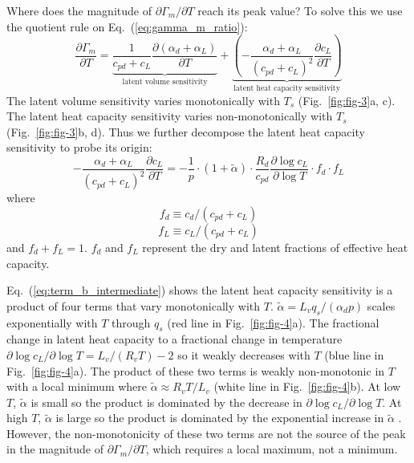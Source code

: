 \documentclass[draft]{ametsocV6.1}
\begin{document}
Where does the magnitude of $\partial\Gamma_m/\partial T$ reach its peak value? To solve this we use the quotient rule on Eq.~(\ref{eq:gamma_m_ratio}):
\begin{equation}
\frac{\partial\Gamma_m}{\partial T} = \underbrace{\frac{1}{c_{pd} + c_L}\frac{\partial(\alpha_d + \alpha_L)}{\partial T}}_{\text{latent volume sensitivity}} + \underbrace{\left(-\frac{\alpha_d + \alpha_L}{(c_{pd} + c_L)^2}\frac{\partial c_L}{\partial T}\right)}_{\text{latent heat capacity sensitivity}} \label{eq:decomposition}
\end{equation}
The latent volume sensitivity varies monotonically with $T_s$ (Fig.~\ref{fig:fig-3}a, c). The latent heat capacity sensitivity varies non-monotonically with $T_s$ (Fig.~\ref{fig:fig-3}b, d). Thus we further decompose the latent heat capacity sensitivity to probe its origin:
\begin{equation}
-\frac{\alpha_d + \alpha_L}{(c_{pd} + c_L)^2}\frac{\partial c_L}{\partial T} = -\frac{1}{p} \cdot \left(1 + \tilde{\alpha}\right) \cdot \frac{R_d}{c_{pd}}\frac{\partial\log{c_L}}{\partial \log{T}} \cdot f_d \cdot f_L \label{eq:term_b_intermediate}
\end{equation}
where
\begin{equation}
f_d \equiv c_{d}/(c_{pd} + c_L) \label{eq:f_d}
\end{equation}
\begin{equation}
f_L \equiv c_{L}/(c_{pd} + c_L) \label{eq:f_L}
\end{equation}
and $f_d + f_L = 1$. $f_d$ and $f_L$ represent the dry and latent fractions of effective heat capacity. 

Eq.~(\ref{eq:term_b_intermediate}) shows the latent heat capacity sensitivity is a product of four terms that vary monotonically with $T$. $\tilde{\alpha}=L_v q_s / (\alpha_d p)$ scales exponentially with $T$ through $q_s$ (red line in Fig.~\ref{fig:fig-4}a). The fractional change in latent heat capacity to a fractional change in temperature $\partial\log{c_L}/\partial\log{T} = L_v / (R_v T) - 2$ so it weakly decreases with $T$ (blue line in Fig.~\ref{fig:fig-4}a). The product of these two terms is weakly non-monotonic in $T$ with a local minimum where $\tilde{\alpha} \approx R_vT/L_v$ (white line in Fig.~\ref{fig:fig-4}b). At low $T$, $\tilde{\alpha}$ is small so the product is dominated by the decrease in $\partial\log{c_L}/\partial\log{T}$. At high $T$, $\tilde{\alpha}$ is large so the product is dominated by the exponential increase in $\tilde{\alpha}$ . However, the non-monotonicity of these two terms are not the source of the peak in the magnitude of $\partial\Gamma_m/\partial T$, which requires a local maximum, not a minimum.
\end{document}
